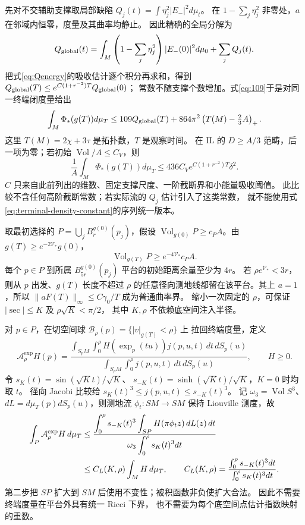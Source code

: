 \documentclass[UTF8,a4paper,11pt,fontset=fandol]{ctexart}
\numberwithin{equation}{section}
\theoremstyle{definition}
\newcommand{\Vol}{\operatorname{Vol}}
\begin{document}
先对不交辅助支撑取局部缺陷 $Q_j(t)=\int\eta_j^2|E_-|^2d\mu_t$。
在 $1-\sum_j\eta_j^2$ 非零处，$a$ 在邻域内恒零，度量及其曲率均静止。
因此精确的全局分解为
\begin{equation}\label{eq:global-stationary-Q}
Q_{\rm global}(t)
=\int_M\left(1-\sum_j\eta_j^2\right)|E_-(0)|^2d\mu_0
+\sum_jQ_j(t).
\end{equation}
把式\eqref{eq:Qenergy}的吸收估计逐个积分再求和，得到
$Q_{\rm global}(T)\le e^{C(1+r^{-2})T}Q_{\rm global}(0)$；
常数不随支撑个数增加。式\eqref{eq:109}于是对同一终端闭度量给出
\[
\int_M\Phi_*(g(T))d\mu_T
\le109Q_{\rm global}(T)
 +864\pi^2\left(T(M)-\tfrac23A\right)_+.
\]
这里 $T(M)=2\chi+3\tau$ 是拓扑数，$T$ 是观察时间。
在 IL 的 $D\ge A/3$ 范畴，后一项为零；若初始 $\Vol/A\le C_V$，则
\begin{equation}\label{eq:terminal-density-constant}
\frac1A\int_M\Phi_*(g(T))d\mu_T
\le436C_V e^{C(1+r^{-2})T}\delta^2.
\end{equation}
$C$ 只来自此前列出的维数、固定支撑尺度、一阶截断界和小能量吸收阈值。
此比较不含任何高阶截断常数；若实际流的 $Q_j$ 估计引入了这类常数，
就不能使用式\eqref{eq:terminal-density-constant}的序列统一版本。

取最初选择的 $P=\bigcup_jB_r^{g(0)}(p_j)$，假设
$\Vol_{g(0)}P\ge c_PA$。由 $g(T)\ge e^{-2\mathcal V_*}g(0)$，
\[
\Vol_{g(T)}P\ge e^{-4\mathcal V_*}c_PA.
\]
每个 $p\in P$ 到所属 $B_{5r}^{g(0)}(p_j)$ 平台的初始距离余量至少为 $4r$。
若 $\rho e^{\mathcal V_*}<3r$，则从 $p$ 出发、$g(T)$ 长度不超过 $\rho$
的任意径向测地线都留在该平台。其上 $a=1$，所以
$\|aF(T)\|_\infty\le C\gamma_0/T$ 成为普通曲率界。
缩小一次固定的 $\rho$，可保证 $|\sec|\le K$ 及 $\rho\sqrt K<\pi/2$，
其中 $K,\rho$ 不依赖底空间注入半径。

对 $p\in P$，在切空间球 $\mathcal B_\rho(p)=\{|v|_{g(T)}<\rho\}$ 上
拉回终端度量，定义
\[
\mathcal A_\rho^{\exp}H(p)
=\frac{\displaystyle\int_{S_pM}\int_0^\rho
H(\exp_p(tu))j(p,u,t)\,dt\,dS_p(u)}
{\displaystyle\int_{S_pM}\int_0^\rho j(p,u,t)\,dt\,dS_p(u)},\qquad H\ge0.
\]
令 $s_K(t)=\sin(\sqrt Kt)/\sqrt K$、
$s_{-K}(t)=\sinh(\sqrt Kt)/\sqrt K$，$K=0$ 时均取 $t$。
径向 Jacobi 比较给 $s_K(t)^3\le j(p,u,t)\le s_{-K}(t)^3$。
记 $\omega_3=\Vol S^3$、$dL=d\mu_T(p)dS_p(u)$，则测地流
$\phi_t:SM\to SM$ 保持 Liouville 测度，故
\begin{align}
\int_P\mathcal A_\rho^{\exp}H\,d\mu_T
&\le\frac{\displaystyle\int_0^\rho s_{-K}(t)^3
\int_{SP}H(\pi\phi_tz)\,dL(z)\,dt}
{\displaystyle\omega_3\int_0^\rho s_K(t)^3dt}\notag\\
&\le C_L(K,\rho)\int_MH\,d\mu_T,\qquad
C_L(K,\rho)=\frac{\int_0^\rho s_{-K}(t)^3dt}
{\int_0^\rho s_K(t)^3dt}.\label{eq:liouville-average}
\end{align}
第二步把 $SP$ 扩大到 $SM$ 后使用不变性；被积函数非负使扩大合法。
因此不需要终端度量在平台外具有统一 Ricci 下界，
也不需要为每个底空间点估计指数映射的重数。
\end{document}
